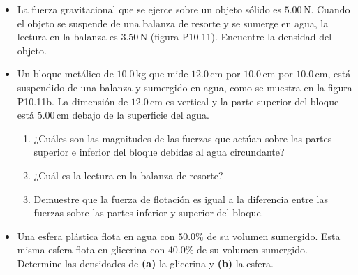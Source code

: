 \documentclass[11pt,a4paper]{article}
\begin{document}
\begin{itemize}
    \item[\textbf{11.}] La fuerza gravitacional que se ejerce sobre un objeto sólido es \(5.00\,\text{N}\). Cuando el objeto se suspende de una balanza de resorte y se sumerge en agua, la lectura en la balanza es \(3.50\,\text{N}\) (figura P10.11). Encuentre la densidad del objeto.
    
    \vspace*{6cm}
    
    \item[\textbf{12.}] Un bloque metálico de \(10.0\,\text{kg}\) que mide \(12.0\,\text{cm}\) por \(10.0\,\text{cm}\) por \(10.0\,\text{cm}\), está suspendido de una balanza y sumergido en agua, como se muestra en la figura P10.11b. La dimensión de \(12.0\,\text{cm}\) es vertical y la parte superior del bloque está \(5.00\,\text{cm}\) debajo de la superficie del agua.
    \begin{enumerate}
        \item ¿Cuáles son las magnitudes de las fuerzas que actúan sobre las partes superior e inferior del bloque debidas al agua circundante?
        \item ¿Cuál es la lectura en la balanza de resorte?
        \item Demuestre que la fuerza de flotación es igual a la diferencia entre las fuerzas sobre las partes inferior y superior del bloque.
    \end{enumerate}
    \vspace*{8cm}
    
    \item[\textbf{13.}] Una esfera plástica flota en agua con \(50.0\%\) de su volumen sumergido. Esta misma esfera flota en glicerina con \(40.0\%\) de su volumen sumergido. Determine las densidades de \textbf{(a)} la glicerina y \textbf{(b)} la esfera.
    \vspace*{6cm}
\end{itemize}

\newpage
\end{document}
